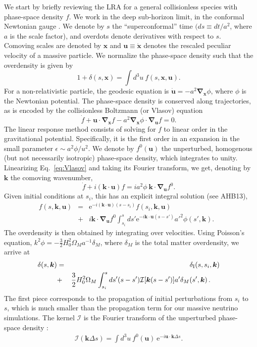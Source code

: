 \documentclass[useAMS, usenatbib]{mnras}
\newcommand{\beq}{\begin{equation}}
\newcommand{\eeq}{\end{equation}}
\newcommand{\barr}{\begin{eqnarray}}
\newcommand{\earr}{\end{eqnarray}}
\newcommand{\rme}{\textrm{e}}
\newcommand{\bs}{\boldsymbol}
\begin{document}
We start by briefly reviewing the LRA for a general collisionless species with phase-space density $f$. We work in the deep sub-horizon limit, in the conformal Newtonian gauge \citep{Ma_1995}. We denote by $s$ the ``superconformal'' time $(ds \equiv dt/a^2$, where $a$ is the scale factor), and overdots denote derivatives with respect to $s$. Comoving scales are denoted by $\bs{x}$ and $\bs{u} \equiv \dot{\bs{x}}$ denotes the rescaled peculiar velocity of a massive particle. We normalize the phase-space density such that the overdensity is given by
\beq
1 + \delta(s, \bs{x}) = \int d^3 u ~ f(s, \bs{x}, \bs{u}).
\eeq
For a non-relativistic particle, the geodesic equation is $\dot{\bs{u}} = - a^2  \bs{\nabla}_{\bs{x}} \phi$, where $\phi$ is the Newtonian potential. The phase-space density is conserved along trajectories, as is encoded by the collisionless Boltzmann (or Vlasov) equation
\beq
\dot{f} + \bs{u} \cdot \bs{\nabla}_{\bs{x}} f - a^2 \bs{\nabla}_{\bs{x}} \phi \cdot \bs{\nabla}_{\bs{u}} f = 0. \label{eq:Vlasov}
\eeq
The linear response method consists of solving for $f$ to linear order in the gravitational potential. Specifically, it is the first order in an expansion in the small parameter $\epsilon \sim a^2 \phi/u^2$. We denote by $f^0(\bs{u})$ the unperturbed, homogenous (but not necessarily isotropic) phase-space density, which integrates to unity. Linearizing Eq.~\eqref{eq:Vlasov} and taking its Fourier transform, we get, denoting by $\bs{k}$ the comoving wavenumber,
\beq
\dot{f} + i (\bs{k} \cdot \bs{u}) f = i a^2 \phi ~ \bs{k} \cdot \bs{\nabla}_{\bs{u}} f^0. \label{eq:Boltz-Fourier}
\eeq
Given initial conditions at $s_i$, this has an explicit integral solution (see AHB13),
\barr
f(s, \bs{k}, \bs{u}) &=& \rme^{- i(\bs{k} \cdot \bs{u}) (s - s_i)} f(s_i, \bs{k}, \bs{u}) \nonumber\\
&+& i \bs{k} \cdot \bs{\nabla}_{\bs{u}} f^0 \int_{s_i}^s d s' \rme^{- i \bs{k} \cdot \bs{u} (s - s')} a'^2 \phi(s', \bs{k}).~~~
\earr
The overdensity is then obtained by integrating over velocities. Using Poisson's equation, $k^2 \phi = - \frac32 H_0^2 \Omega_M a^{-1} \delta_M$, where $\delta_M$ is the total matter overdensity, we arrive at
\barr
\delta(s, \bs{k}) &=& \delta_{\rm I}(s,s_i, \bs{k})\nonumber\\
&+& \frac32 H_0^2 \Omega_M \int_{s_i}^s d s' (s-s') \mathcal{I}[\bs{k}(s-s')] a' \delta_M(s', \bs{k})\,. ~~~~\label{eq:delta-phi}
\earr
The first piece corresponds to the propagation of initial perturbations from $s_i$ to $s$,
which is much smaller than the propagation term for our massive neutrino simulations.
The kernel $\mathcal{I}$ is the Fourier transform of the unperturbed phase-space density \citep{Brandenberger_1987, Bertschinger_Watts_1988}:
\barr
\mathcal{I}(\bs{k}\Delta s ) %
= \int d^3 u ~ f^0(\bs{u})~\rme^{- i \bs{u} \cdot \bs{k} \Delta s}. \label{eq:I(k)}
\earr
\end{document}
